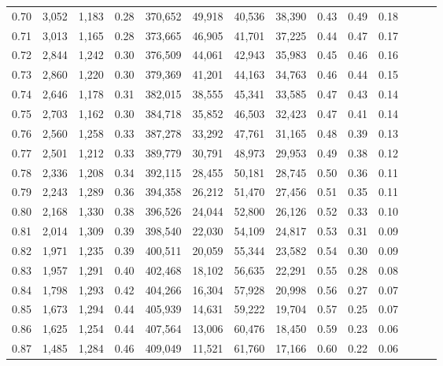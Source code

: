\begin{tabular}{rrrrrrrrrrrrrr}
0.70 &   3,052 &  1,183 &  0.28 &  370,652 &   49,918 &  40,536 &  38,390 &  0.43 &  0.49 &      0.18 \\
0.71 &   3,013 &  1,165 &  0.28 &  373,665 &   46,905 &  41,701 &  37,225 &  0.44 &  0.47 &      0.17 \\
0.72 &   2,844 &  1,242 &  0.30 &  376,509 &   44,061 &  42,943 &  35,983 &  0.45 &  0.46 &      0.16 \\
0.73 &   2,860 &  1,220 &  0.30 &  379,369 &   41,201 &  44,163 &  34,763 &  0.46 &  0.44 &      0.15 \\
0.74 &   2,646 &  1,178 &  0.31 &  382,015 &   38,555 &  45,341 &  33,585 &  0.47 &  0.43 &      0.14 \\
0.75 &   2,703 &  1,162 &  0.30 &  384,718 &   35,852 &  46,503 &  32,423 &  0.47 &  0.41 &      0.14 \\
0.76 &   2,560 &  1,258 &  0.33 &  387,278 &   33,292 &  47,761 &  31,165 &  0.48 &  0.39 &      0.13 \\
0.77 &   2,501 &  1,212 &  0.33 &  389,779 &   30,791 &  48,973 &  29,953 &  0.49 &  0.38 &      0.12 \\
0.78 &   2,336 &  1,208 &  0.34 &  392,115 &   28,455 &  50,181 &  28,745 &  0.50 &  0.36 &      0.11 \\
0.79 &   2,243 &  1,289 &  0.36 &  394,358 &   26,212 &  51,470 &  27,456 &  0.51 &  0.35 &      0.11 \\
0.80 &   2,168 &  1,330 &  0.38 &  396,526 &   24,044 &  52,800 &  26,126 &  0.52 &  0.33 &      0.10 \\
0.81 &   2,014 &  1,309 &  0.39 &  398,540 &   22,030 &  54,109 &  24,817 &  0.53 &  0.31 &      0.09 \\
0.82 &   1,971 &  1,235 &  0.39 &  400,511 &   20,059 &  55,344 &  23,582 &  0.54 &  0.30 &      0.09 \\
0.83 &   1,957 &  1,291 &  0.40 &  402,468 &   18,102 &  56,635 &  22,291 &  0.55 &  0.28 &      0.08 \\
0.84 &   1,798 &  1,293 &  0.42 &  404,266 &   16,304 &  57,928 &  20,998 &  0.56 &  0.27 &      0.07 \\
0.85 &   1,673 &  1,294 &  0.44 &  405,939 &   14,631 &  59,222 &  19,704 &  0.57 &  0.25 &      0.07 \\
0.86 &   1,625 &  1,254 &  0.44 &  407,564 &   13,006 &  60,476 &  18,450 &  0.59 &  0.23 &      0.06 \\
0.87 &   1,485 &  1,284 &  0.46 &  409,049 &   11,521 &  61,760 &  17,166 &  0.60 &  0.22 &      0.06 \\

\end{tabular}
